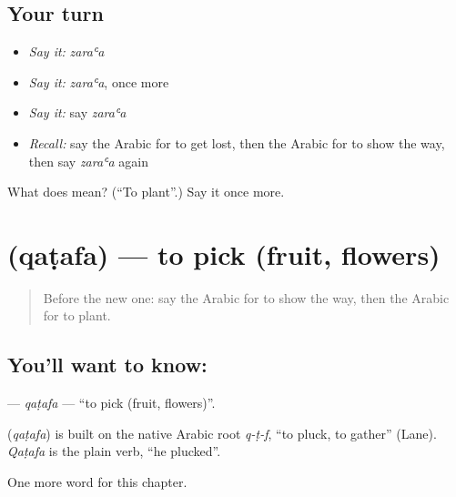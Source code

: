 \subsection*{Your turn}
\begin{itemize}
\raggedright
  \item \emph{Say it:} \emph{zaraʿa}
  \item \emph{Say it:} \emph{zaraʿa}, once more
  \item \emph{Say it:} say \emph{zaraʿa}
  \item \emph{Recall:} say the Arabic for to get lost, then the Arabic for to show the way, then say \emph{zaraʿa} again
\end{itemize}

\begin{tcolorbox}[breakable,colback=teal!4,colframe=teal!35!black,title={Before you move on}]
What does  mean? (\textquotedblleft{}To plant\textquotedblright{}.) Say it once more.
\end{tcolorbox}
\section[\texorpdfstring{\ar{قطف} (qaṭafa)}{قطف (qaṭafa)}]{ (qaṭafa) — to pick (fruit, flowers)}

\label{lesson:AR-C196-qatafa}



\begin{quote}
Before the new one: say the Arabic for to show the way, then the Arabic for to plant.
\end{quote}

\subsection*{You'll want to know: }
\textbf{} — \emph{qaṭafa} — \textquotedblleft{}to pick (fruit, flowers)\textquotedblright{}.

\begin{cousinweb}
\textbf{} (\emph{qaṭafa}) is built on the native Arabic root \emph{q-ṭ-f}, \textquotedblleft{}to pluck, to gather\textquotedblright{} (Lane). \emph{Qaṭafa} is the plain verb, \textquotedblleft{}he plucked\textquotedblright{}.
\end{cousinweb}

\begin{grammarlens}[title={What you've built}]
One more word for this chapter.
\end{grammarlens}

